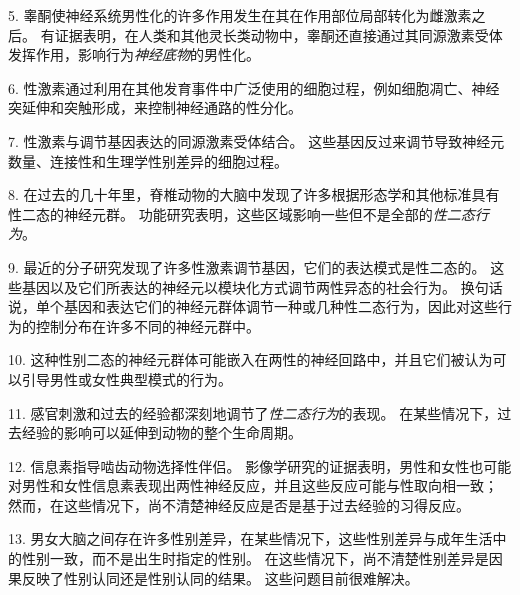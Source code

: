 5. 睾酮使神经系统男性化的许多作用发生在其在作用部位局部转化为雌激素之后。
有证据表明，在人类和其他灵长类动物中，睾酮还直接通过其同源激素受体发挥作用，影响行为\textit{神经底物}的男性化。


6. 性激素通过利用在其他发育事件中广泛使用的细胞过程，例如细胞凋亡、神经突延伸和突触形成，来控制神经通路的性分化。


7. 性激素与调节基因表达的同源激素受体结合。
这些基因反过来调节导致神经元数量、连接性和生理学性别差异的细胞过程。


8. 在过去的几十年里，脊椎动物的大脑中发现了许多根据形态学和其他标准具有性二态的神经元群。
功能研究表明，这些区域影响一些但不是全部的\textit{性二态行为}。


9. 最近的分子研究发现了许多性激素调节基因，它们的表达模式是性二态的。
这些基因以及它们所表达的神经元以模块化方式调节两性异态的社会行为。
换句话说，单个基因和表达它们的神经元群体调节一种或几种性二态行为，因此对这些行为的控制分布在许多不同的神经元群中。


10. 这种性别二态的神经元群体可能嵌入在两性的神经回路中，并且它们被认为可以引导男性或女性典型模式的行为。


11. 感官刺激和过去的经验都深刻地调节了\textit{性二态行为}的表现。
在某些情况下，过去经验的影响可以延伸到动物的整个生命周期。


12. 信息素指导啮齿动物选择性伴侣。
影像学研究的证据表明，男性和女性也可能对男性和女性信息素表现出两性神经反应，并且这些反应可能与性取向相一致；
然而，在这些情况下，尚不清楚神经反应是否是基于过去经验的习得反应。


13. 男女大脑之间存在许多性别差异，在某些情况下，这些性别差异与成年生活中的性别一致，而不是出生时指定的性别。
在这些情况下，尚不清楚性别差异是因果反映了性别认同还是性别认同的结果。
这些问题目前很难解决。



